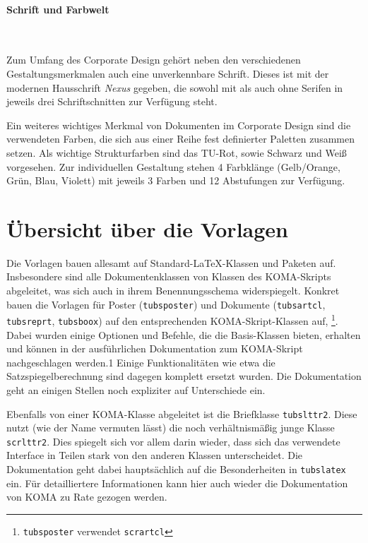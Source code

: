 \paragraph{Schrift und Farbwelt}\hfill\\
\begin{minipage}[t]{0.45\textwidth}
\vspace*{0pt}
\centering{}%
\end{minipage}
\begin{minipage}[t]{0.55\textwidth}
\vspace*{0pt}
Zum Umfang des Corporate Design gehört neben den verschiedenen
Gestaltungsmerkmalen auch eine unverkennbare Schrift.
Dieses ist mit der modernen Hausschrift \emph{Nexus} gegeben, die sowohl mit als auch
ohne Serifen in jeweils drei Schriftschnitten zur Verfügung steht.

Ein weiteres wichtiges Merkmal von Dokumenten im Corporate Design sind
die verwendeten Farben, die sich aus einer Reihe fest definierter Paletten
zusammen setzen.
Als wichtige Strukturfarben sind das TU-Rot, sowie Schwarz und Weiß vorgesehen.
Zur individuellen Gestaltung stehen 4 Farbklänge (Gelb/Orange, Grün, Blau, Violett)
mit jeweils 3 Farben und 12 Abstufungen zur Verfügung.
\end{minipage}

\clearpage
\section{Übersicht über die Vorlagen}

Die Vorlagen bauen allesamt auf Standard-\LaTeX-Klassen und Paketen auf.
Insbesondere sind alle Dokumentenklassen von Klassen des KOMA-Skripts
abgeleitet, was sich auch in ihrem Benennungsschema widerspiegelt.
Konkret bauen die Vorlagen für Poster (\texttt{tubsposter}) und Dokumente
(\texttt{tubsartcl}, \texttt{tubsreprt}, \texttt{tubsboox}) auf
den entsprechenden KOMA-Skript-Klassen auf,%
\footnote{\texttt{tubsposter} verwendet \texttt{scrartcl}}.
Dabei wurden einige Optionen und Befehle, die die Basis-Klassen bieten, erhalten
und können in der ausführlichen Dokumentation zum KOMA-Skript\cite{koma-skript}
nachgeschlagen werden.1
Einige Funktionalitäten wie etwa die Satzspiegelberechnung sind dagegen
komplett ersetzt wurden.
Die Dokumentation geht an einigen Stellen noch expliziter auf Unterschiede ein.

Ebenfalls von einer KOMA-Klasse abgeleitet ist die Briefklasse
\texttt{tubslttr2}.
Diese nutzt (wie der Name vermuten lässt) die noch verhältnismäßig junge
Klasse \texttt{scrlttr2}. Dies spiegelt sich vor allem darin wieder, dass sich
das verwendete Interface in Teilen stark von den anderen Klassen unterscheidet.
Die Dokumentation geht dabei hauptsächlich auf die Besonderheiten in
\texttt{tubslatex} ein.
Für detailliertere Informationen kann hier auch wieder die Dokumentation von
KOMA\cite{koma-skript} zu Rate gezogen werden.

